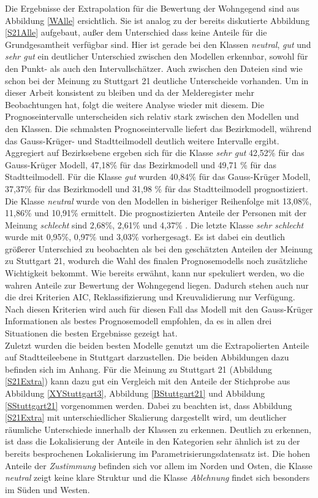 \documentclass{Vorlage}
\begin{document}
Die Ergebnisse der Extrapolation für die Bewertung der Wohngegend sind aus Abbildung \ref{WAlle} ersichtlich. Sie ist analog zu der  bereits diskutierte Abbildung \ref{S21Alle} aufgebaut, außer dem Unterschied dass keine Anteile für die Grundgesamtheit verfügbar sind. Hier ist gerade bei den Klassen \textit{neutral}, \textit{gut} und \textit{sehr gut} ein deutlicher Unterschied zwischen den Modellen erkennbar, sowohl für den Punkt- als auch den Intervallschätzer. Auch zwischen den Dateien sind wie schon bei der Meinung zu Stuttgart 21 deutliche Unterscheide vorhanden. Um in dieser Arbeit konsistent zu bleiben und da der Melderegister mehr Beobachtungen hat, folgt die weitere Analyse wieder mit diesem. Die Prognoseintervalle unterscheiden sich relativ stark zwischen den Modellen und den Klassen. Die schmalsten Prognoseintervalle liefert das Bezirkmodell, während das Gauss-Krüger- und Stadtteilmodell deutlich weitere Intervalle ergibt. Aggregiert auf Bezirksebene ergeben sich für die Klasse \textit{sehr gut} 42,52\% für das Gauss-Krüger Modell, 47,18\% für das Bezirkmodell und 49,71 \% für das Stadtteilmodell.  Für die Klasse \textit{gut} wurden 40,84\% für das Gauss-Krüger Modell, 37,37\% für das Bezirkmodell und 31,98 \% für das Stadtteilmodell prognostiziert. Die Klasse \textit{neutral} wurde von den Modellen in bisheriger Reihenfolge mit 13,08\%, 11,86\% und 10,91\% ermittelt. Die prognostizierten Anteile der Personen mit der Meinung \textit{schlecht}  sind 2,68\%, 2,61\% und 4,37\% . Die letzte Klasse \textit{sehr schlecht} wurde mit 0,95\%, 0,97\% und 3,03\% vorhergesagt. Es ist dabei ein deutlich größerer Unterschied zu beobachten als bei den geschätzten Anteilen der Meinung zu Stuttgart 21, wodurch die Wahl des finalen Prognosemodells noch zusätzliche Wichtigkeit bekommt. Wie bereits erwähnt, kann nur spekuliert werden, wo die wahren Anteile zur Bewertung der Wohngegend liegen. Dadurch stehen auch nur die drei Kriterien AIC, Reklassifizierung und Kreuvalidierung nur Verfügung. Nach diesen Kriterien wird auch für diesen Fall das Modell mit den Gauss-Krüger Informationen als bestes Prognosemodell empfohlen, da es in allen drei Situationen die besten Ergebnisse gezeigt hat.\\
Zuletzt wurden die beiden besten Modelle genutzt um die Extrapolierten Anteile auf Stadtteileebene in Stuttgart darzustellen. Die beiden Abbildungen dazu befinden sich im Anhang. Für die Meinung zu Stuttgart 21 (Abbildung \ref{S21Extra}) kann dazu gut ein Vergleich mit den Anteile der Stichprobe aus Abbildung \ref{XYStuttgart3}, Abbildung \ref{BStuttgart21} und Abbildung \ref{SStuttgart21} vorgenommen werden. Dabei zu beachten ist, dass Abbildung \ref{S21Extra} mit unterschiedlicher Skalierung dargestellt wird, um deutlicher räumliche Unterschiede innerhalb der Klassen zu erkennen. Deutlich zu erkennen, ist dass die Lokalisierung der Anteile in den Kategorien sehr ähnlich ist zu der bereits besprochenen Lokalisierung im Parametrisierungsdatensatz ist. Die hohen Anteile der \textit{Zustimmung} befinden sich vor allem im Norden und Osten, die Klasse \textit{neutral} zeigt keine klare Struktur und die Klasse \textit{Ablehnung} findet sich besonders im Süden und Westen.\\
\end{document}
